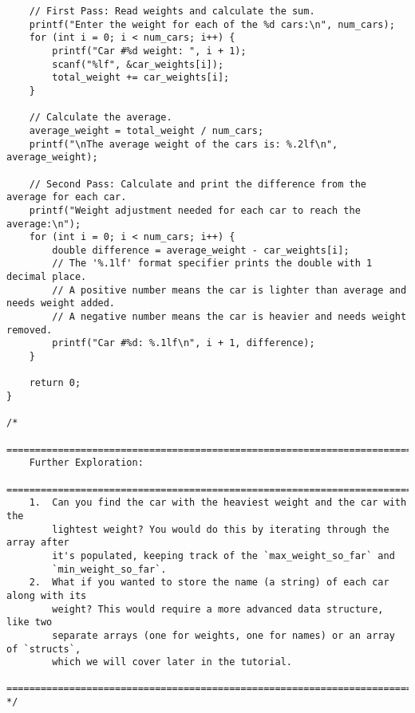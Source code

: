 \documentclass[11pt]{book}
\begin{document}
\begin{verbatim}
    // First Pass: Read weights and calculate the sum.
    printf("Enter the weight for each of the %d cars:\n", num_cars);
    for (int i = 0; i < num_cars; i++) {
        printf("Car #%d weight: ", i + 1);
        scanf("%lf", &car_weights[i]);
        total_weight += car_weights[i];
    }

    // Calculate the average.
    average_weight = total_weight / num_cars;
    printf("\nThe average weight of the cars is: %.2lf\n", average_weight);

    // Second Pass: Calculate and print the difference from the average for each car.
    printf("Weight adjustment needed for each car to reach the average:\n");
    for (int i = 0; i < num_cars; i++) {
        double difference = average_weight - car_weights[i];
        // The '%.1lf' format specifier prints the double with 1 decimal place.
        // A positive number means the car is lighter than average and needs weight added.
        // A negative number means the car is heavier and needs weight removed.
        printf("Car #%d: %.1lf\n", i + 1, difference);
    }

    return 0;
}

/*
    ================================================================================
    Further Exploration:
    ================================================================================
    1.  Can you find the car with the heaviest weight and the car with the
        lightest weight? You would do this by iterating through the array after
        it's populated, keeping track of the `max_weight_so_far` and
        `min_weight_so_far`.
    2.  What if you wanted to store the name (a string) of each car along with its
        weight? This would require a more advanced data structure, like two
        separate arrays (one for weights, one for names) or an array of `structs`,
        which we will cover later in the tutorial.
    ================================================================================
*/

\end{verbatim}
\clearpage
\end{document}

